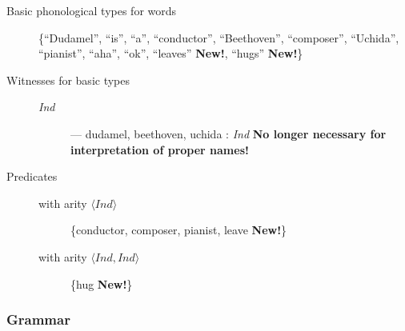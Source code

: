 \begin{description}

  
\item[Basic phonological  types for words] \mbox{}

  \{``Dudamel'', ``is'', ``a'', ``conductor'', ``Beethoven'',
  ``composer'', ``Uchida'', ``pianist'', ``aha'', ``ok'', ``leaves''
  \textbf{New!}, ``hugs'' \textbf{New!}\}

\item [Witnesses for basic types] \mbox{}

  \begin{description}
\item[\textnormal{\textit{Ind}}] --- dudamel, beethoven, uchida :
  \textit{Ind} \textbf{No longer necessary for interpretation of
    proper names!}
  \end{description}

  
\item[Predicates] \mbox{}
  
  \begin{description}
  
  \item[with arity \textnormal{$\langle\textit{Ind}\rangle$}]
    \{conductor, composer, pianist, leave \textbf{New!}\}
    
  \item[with arity \textnormal{$\langle\textit{Ind},\textit{Ind}\rangle$}] \{hug \textbf{New!}\}
  \end{description}
  

\end{description}

\subsubsection{Grammar} 

